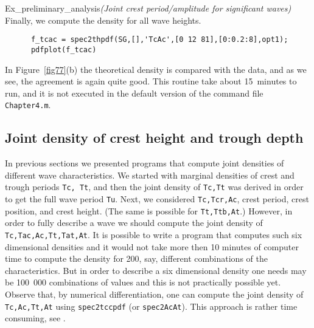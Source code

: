 \begin{cex}{Ex_preliminary_analysis}{\sl (Joint crest period/amplitude for significant waves)}
Finally, we compute the density for all wave heights.
{\small\begin{verbatim}
      f_tcac = spec2thpdf(SG,[],'TcAc',[0 12 81],[0:0.2:8],opt1);
      pdfplot(f_tcac)
\end{verbatim}
}
In
Figure~\ref{fig77}(b) the theoretical density is compared with the
data, and as we see, the agreement is again quite good.
This routine take about 15~minutes to run, and it is not executed in the
default version of the command file {\tt Chapter4.m}.
\end{cex}

\subsection{Joint density of crest height and trough depth}


In previous sections we presented programs that compute joint
densities of different  wave characteristics. We started with marginal
densities of crest and trough periods {\tt Tc, Tt}, and then the joint
density of  {\tt Tc,Tt} was derived in order to get the full wave
period {\tt Tu}. Next, we considered {\tt Tc,Tcr,Ac}, crest period,
crest position, and crest height. (The same is possible for
{\tt Tt,Ttb,At}.)
However, in order to fully describe a wave we should
compute the joint density of {\tt Tc,Tac,Ac,Tt,Tat,At}. It is
possible to write a program that computes such six dimensional
densities and it would not take more then 10 minutes of computer time
to compute the density for 200, say,  different combinations of the
characteristics. But in order to describe a six dimensional density
one needs may be 100~000 combinations of values and this is not
practically possible yet.
Observe that, by numerical differentiation, one can compute the joint
density of {\tt Tc,Ac,Tt,At} using {\tt spec2tccpdf}
(or {\tt spec2AcAt}). This approach is rather time consuming, 
see \cite{LindgrenAndBroberg2004Cycle}.

